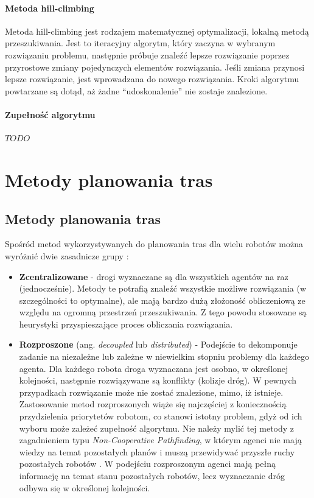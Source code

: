 \subsubsection{Metoda hill-climbing}
Metoda hill-climbing jest rodzajem matematycznej optymalizacji, lokalną metodą przeszukiwania.
Jest to iteracyjny algorytm, który zaczyna w wybranym rozwiązaniu problemu, następnie próbuje znaleźć lepsze rozwiązanie poprzez przyrostowe zmiany pojedynczych elementów rozwiązania.
Jeśli zmiana przynosi lepsze rozwiązanie, jest wprowadzana do nowego rozwiązania.
Kroki algorytmu powtarzane są dotąd, aż żadne ``udoskonalenie'' nie zostaje znalezione.

\subsubsection{Zupełność algorytmu}
$TODO$

\chapter{Metody planowania tras}
\label{ch:path_planning_methods}

\section{Metody planowania tras}
Spośród metod wykorzystywanych do planowania tras dla wielu robotów można wyróżnić dwie zasadnicze grupy \cite{latombe}:
\begin{itemize}
	\item {\bf Zcentralizowane} - drogi wyznaczane są dla wszystkich agentów na raz (jednocześnie). Metody te potrafią znaleźć wszystkie możliwe rozwiązania (w szczególności to optymalne), ale mają bardzo dużą złożoność obliczeniową ze względu na ogromną przestrzeń przeszukiwania. Z tego powodu stosowane są heurystyki przyspieszające proces obliczania rozwiązania.
	\item {\bf Rozproszone} (ang. {\it decoupled} lub {\it distributed}) - Podejście to dekomponuje zadanie na niezależne lub zależne w niewielkim stopniu problemy dla każdego agenta. Dla każdego robota droga wyznaczana jest osobno, w określonej kolejności, następnie rozwiązywane są konflikty (kolizje dróg). W pewnych przypadkach rozwiązanie może nie zostać znalezione, mimo, iż istnieje. Zastosowanie metod rozproszonych wiąże się najczęściej z koniecznością przydzielenia priorytetów robotom, co stanowi istotny problem, gdyż od ich wyboru może zależeć zupełność algorytmu. Nie należy mylić tej metody z zagadnieniem typu {\it Non-Cooperative Pathfinding}, w którym agenci nie mają wiedzy na temat pozostałych planów i muszą przewidywać przyszłe ruchy pozostałych robotów \cite{cooppath}. W podejściu rozproszonym agenci mają pełną informację na temat stanu pozostałych robotów, lecz wyznaczanie dróg odbywa się w określonej kolejności.
\end{itemize}

